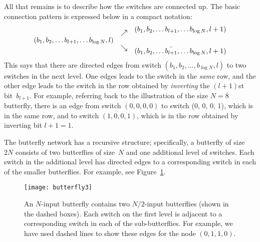 All that remains is to describe how the switches are connected up.
The basic connection pattern is expressed below in a compact notation:
\begin{equation*}
\begin{array}{lcr}
    &\raisebox{-5pt}{$\nearrow$}& (b_1, b_2, \dots b_{l + 1}, \dots b_{\log N}, l + 1) \\
(b_1, b_2, \dots b_{l + 1}, \dots b_{\log N}, l) &\\
    &\raisebox{5pt}{$\searrow$}& (b_1, b_2, \dots \bar{b_{l + 1}}, \dots b_{\log N}, l + 1) \\
\end{array}
\end{equation*}
This says that there are directed edges from switch $(b_1, b_2, \dots,
b_{\log N}, l)$ to two switches in the next level.  One edges leads to
the switch in the \emph{same} row, and the other edge leads to the
switch in the row obtained by \emph{inverting} the $(l + 1)$st
bit~$b_{l + 1}$.  For example, referring back to the illustration of
the size $N = 8$ butterfly, there is an edge from switch $(0, 0, 0,
0)$ to switch (0, 0, 0, 1), which is in the same row, and to switch
$(1, 0, 0, 1)$, which is in the row obtained by inverting bit $l + 1 =
1$.

The butterfly network has a recursive structure; specifically, a
butterfly of size~$2N$ consists of two butterflies of size~$N$ and one
additional level of switches.  Each switch in the additional level has
directed edges to a corresponding switch in each of the smaller
butterflies.  For example, see Figure~\ref{fig:6EP}.

\begin{figure}

\texttt{[image: butterfly3]}

\caption{An $N$-input butterfly contains two $N/2$-input butterflies
  (shown in the dashed boxes). Each switch on the first level is
  adjacent to a corresponding switch in each of the sub-butterflies.
  For example, we have used dashed lines to show these edges for the
  node $(0, 1, 1, 0)$.}

\label{fig:6EP}

\end{figure}

